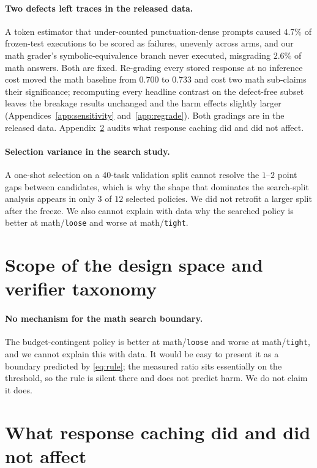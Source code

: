 \documentclass{article}
\begin{document}
\paragraph{Two defects left traces in the released data.} A token estimator that
under-counted punctuation-dense prompts caused $4.7\%$ of frozen-test executions
to be scored as failures, unevenly across arms, and our math grader's
symbolic-equivalence branch never executed, misgrading $2.6\%$ of math answers.
Both are fixed. Re-grading every stored response at no inference cost moved the
math baseline from $0.700$ to $0.733$ and cost two math sub-claims their
significance; recomputing every headline contrast on the defect-free subset
leaves the breakage results unchanged and the harm effects slightly larger
(Appendices~\ref{app:sensitivity} and~\ref{app:regrade}). Both gradings are in
the released data. Appendix~\ref{app:cacheaudit} audits what response caching
did and did not affect.

\paragraph{Selection variance in the search study.} A one-shot selection on a
40-task validation split cannot resolve the $1$--$2$ point gaps between
candidates, which is why the shape that dominates the search-split analysis
appears in only $3$ of $12$ selected policies. We did not retrofit a larger
split after the freeze. We also cannot explain with data why the searched policy
is better at math/\texttt{loose} and worse at math/\texttt{tight}.

\section{Scope of the design space and verifier taxonomy}
\label{app:scope}

\paragraph{No mechanism for the math search boundary.} The budget-contingent
policy is better at math/\texttt{loose} and worse at math/\texttt{tight}, and we
cannot explain this with data. It would be easy to present it as a boundary
predicted by \eqref{eq:rule}; the measured ratio sits essentially on the
threshold, so the rule is silent there and does not predict harm. We do not
claim it does.

\section{What response caching did and did not affect}
\label{app:cacheaudit}
\end{document}
